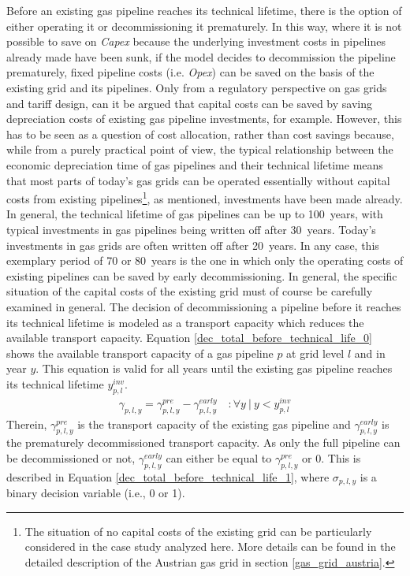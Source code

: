 Before an existing gas pipeline reaches its technical lifetime, there is the option of either operating it or decommissioning it prematurely. In this way, where it is not possible to save on \textit{Capex} because the underlying investment costs in pipelines already made have been sunk, if the model decides to decommission the pipeline prematurely, fixed pipeline costs (i.e. \textit{Opex}) can be saved on the basis of the existing grid and its pipelines. Only from a regulatory perspective on gas grids and tariff design, can it be argued that capital costs can be saved by saving depreciation costs of existing gas pipeline investments, for example. However, this has to be seen as a question of cost allocation, rather than cost savings because, while from a purely practical point of view, the typical relationship between the economic depreciation time of gas pipelines and their technical lifetime means that most parts of today's gas grids can be operated essentially without capital costs from existing pipelines\footnote{The situation of no capital costs of the existing grid can be particularly considered in the case study analyzed here. More details can be found in the detailed description of the Austrian gas grid in section \ref{gas_grid_austria}.}, as mentioned, investments have been made already. In general, the technical lifetime of gas pipelines can be up to \SI{100}{years}, with typical investments in gas pipelines being written off after \SI{30}{years}. Today's investments in gas grids are often written off after \SI{20}{years}. In any case, this exemplary period of \SI{70}{} or \SI{80}{years} is the one in which only the operating costs of existing pipelines can be saved by early decommissioning. In general, the specific situation of the capital costs of the existing grid must of course be carefully examined in general. The decision of decommissioning a pipeline before it reaches its technical lifetime is modeled as a transport capacity which reduces the available transport capacity. Equation \ref{dec_total_before_technical_life_0} shows the available transport capacity of a gas pipeline $p$ at grid level $l$ and in year $y$. This equation is valid for all years until the existing gas pipeline reaches its technical lifetime $y^{inv}_{p,l}$. 
\begin{align}\label{dec_total_before_technical_life_0}
	\gamma_{p,l, y} = \gamma^{pre}_{p,l,y} - \gamma^{early}_{p,l, y} \quad:\forall y~|~y<y^{inv}_{p,l}
\end{align}
Therein, $\gamma^{pre}_{p,l,y}$ is the transport capacity of the existing gas pipeline and $\gamma^{early}_{p,l, y}$ is the prematurely decommissioned transport capacity. As only the full pipeline can be decommissioned or not, $\gamma^{early}_{p,l, y}$ can either be equal to $\gamma^{pre}_{p,l,y}$ or 0. This is described in Equation \ref{dec_total_before_technical_life_1}, where $\sigma_{p,l,y}$ is a binary decision variable (i.e., 0 or 1).
